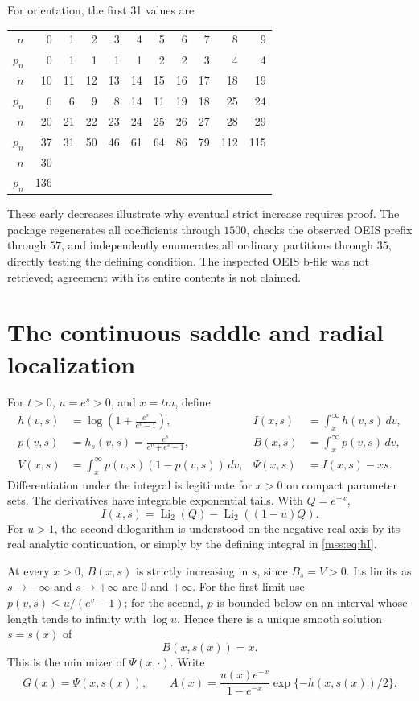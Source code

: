 \documentclass[11pt,letterpaper]{article}
\numberwithin{equation}{section}
\theoremstyle{definition}\newtheorem{definition}[theorem]{Definition}
\theoremstyle{remark}\newtheorem{remark}[theorem]{Remark}
\DeclareMathOperator{\Li}{Li}
\begin{document}
For orientation, the first 31 values are
\begin{center}\small
\begin{tabular}{@{}r*{10}{r}@{}}\toprule
$n$&0&1&2&3&4&5&6&7&8&9\\
$p_n$&0&1&1&1&1&2&2&3&4&4\\\midrule
$n$&10&11&12&13&14&15&16&17&18&19\\
$p_n$&6&6&9&8&14&11&19&18&25&24\\\midrule
$n$&20&21&22&23&24&25&26&27&28&29\\
$p_n$&37&31&50&46&61&64&86&79&112&115\\\midrule
$n$&30&&&&&&&&&\\
$p_n$&136&&&&&&&&&\\\bottomrule
\end{tabular}
\end{center}
These early decreases illustrate why eventual strict increase requires proof. The package regenerates all coefficients through $1500$, checks the observed OEIS prefix through $57$, and independently enumerates all ordinary partitions through $35$, directly testing the defining condition. The inspected OEIS b-file was not retrieved; agreement with its entire contents is not claimed.

\section{The continuous saddle and radial localization}\label{mss:sec:radial}
For $t>0$, $u=e^s>0$, and $x=tm$, define
\begin{align}\label{mss:eq:hI}
h(v,s)&=\log\left(1+\frac{e^s}{e^v-1}\right),&
I(x,s)&=\int_x^\infty h(v,s)\,dv,\\
p(v,s)&=h_s(v,s)=\frac{e^s}{e^v+e^s-1},&
B(x,s)&=\int_x^\infty p(v,s)\,dv,\nonumber\\
V(x,s)&=\int_x^\infty p(v,s)(1-p(v,s))\,dv,&
\Psi(x,s)&=I(x,s)-xs.\nonumber
\end{align}
Differentiation under the integral is legitimate for $x>0$ on compact parameter sets. The derivatives have integrable exponential tails. With $Q=e^{-x}$,
\begin{equation}\label{mss:eq:dilog}
I(x,s)=\Li_2(Q)-\Li_2((1-u)Q).
\end{equation}
For $u>1$, the second dilogarithm is understood on the negative real axis by its real analytic continuation, or simply by the defining integral in \eqref{mss:eq:hI}.

At every $x>0$, $B(x,s)$ is strictly increasing in $s$, since $B_s=V>0$. Its limits as $s\to-\infty$ and $s\to+\infty$ are $0$ and $+\infty$. For the first limit use $p(v,s)\le u/(e^v-1)$; for the second, $p$ is bounded below on an interval whose length tends to infinity with $\log u$. Hence there is a unique smooth solution $s=s(x)$ of
\begin{equation}\label{mss:eq:occupancy}
B(x,s(x))=x.
\end{equation}
This is the minimizer of $\Psi(x,\cdot)$. Write
\begin{equation}\label{mss:eq:GA}
G(x)=\Psi(x,s(x)),\qquad
A(x)=\frac{u(x)e^{-x}}{1-e^{-x}}
\exp\{-h(x,s(x))/2\}.
\end{equation}
\end{document}
